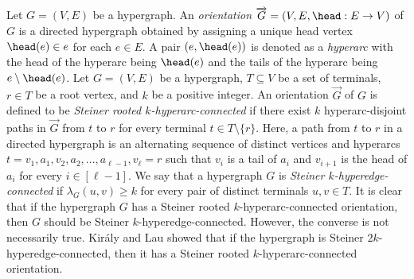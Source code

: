 Let $G=(V, E)$ be a hypergraph. An \emph{orientation} $\overrightarrow{G}=(V, E, \head:E\rightarrow V)$ of $G$ is a directed hypergraph obtained by assigning a unique head vertex $\head(e)\in e$ for each $e\in E$. 
A pair $(e, \head(e))$ is denoted as a \emph{hyperarc} with the head of the hyperarc being $\head(e)$ and the tails of the hyperarc being $e\setminus \head(e)$. 
Let $G=(V, E)$ be a hypergraph, $T\subseteq V$ be a set of terminals, $r\in T$ be a root vertex, and $k$ be a positive integer. An orientation $\overrightarrow{G}$ of $G$ is defined to be \emph{Steiner rooted $k$-hyperarc-connected} if there exist $k$ hyperarc-disjoint paths in $\overrightarrow{G}$ 
from $t$ to $r$ 
for every terminal $t\in T\setminus \{r\}$. Here, a path from $t$ to $r$ in a directed hypergraph is an alternating sequence of distinct vertices and hyperarcs $t=v_1, a_1, v_2, a_2, ..., a_{\ell-1}, v_{\ell}=r$ such that 
$v_i$ is a tail of $a_i$ and $v_{i+1}$ is the head of $a_i$ 
for every $i\in [\ell-1]$. We say that a hypergraph $G$ is \emph{Steiner $k$-hyperedge-connected} if 
$\lambda_G(u,v)\ge k$ for 
every pair of distinct terminals $u, v\in T$. 
It is clear that if the hypergraph $G$ has a Steiner rooted $k$-hyperarc-connected orientation, then $G$ should be Steiner $k$-hyperedge-connected. However, the converse is not necessarily true. Kir\'{a}ly and Lau \cite{Kiraly-Lau} showed that if the hypergraph is Steiner $2k$-hyperedge-connected, then it has a Steiner rooted $k$-hyperarc-connected orientation. 

